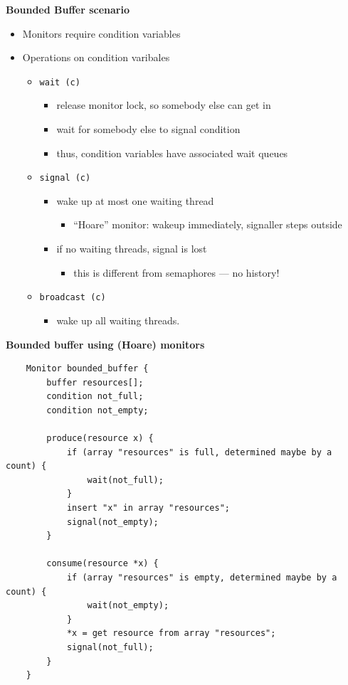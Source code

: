 \documentclass[11pt,a4paper]{article}
\begin{document}
\textbf{Bounded Buffer scenario}
\begin{itemize}
    \item Monitors require condition variables
    \item Operations on condition varibales
        \begin{itemize}
            \item \texttt{wait\,(c)}
                \begin{itemize}
                    \item release monitor lock, so somebody else can get in
                    \item wait for somebody else to signal condition
                    \item thus, condition variables have associated wait queues
                \end{itemize}
            \item \texttt{signal\,(c)}
                \begin{itemize}
                    \item wake up at most one waiting thread
                        \begin{itemize}
                            \item ``Hoare'' monitor: wakeup immediately, signaller steps
                                outside
                        \end{itemize}
                    \item if no waiting threads, signal is lost
                        \begin{itemize}
                            \item this is different from semaphores --- no history!
                        \end{itemize}
                \end{itemize}
            \item \texttt{broadcast\,(c)}
                \begin{itemize}
                    \item wake up all waiting threads.
                \end{itemize}
        \end{itemize}
\end{itemize}

\textbf{Bounded buffer using (Hoare) monitors}
\begin{verbatim}
    Monitor bounded_buffer {
        buffer resources[];
        condition not_full;
        condition not_empty;

        produce(resource x) {
            if (array "resources" is full, determined maybe by a count) {
                wait(not_full);
            }
            insert "x" in array "resources";
            signal(not_empty);
        }

        consume(resource *x) {
            if (array "resources" is empty, determined maybe by a count) {
                wait(not_empty);
            }
            *x = get resource from array "resources";
            signal(not_full);
        }
    }
\end{verbatim}
\end{document}
